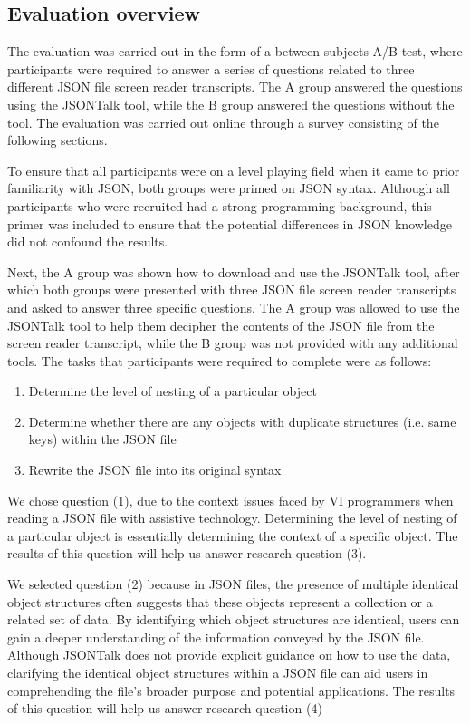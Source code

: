\documentclass{l4proj}
\begin{document}
\subsection{Evaluation overview}
The evaluation was carried out in the form of a between-subjects A/B test, where participants were required to answer a series of questions related to three different JSON file screen reader transcripts. The A group answered the questions using the JSONTalk tool, while the B group answered the questions without the tool. The evaluation was carried out online through a survey consisting of the following sections.

To ensure that all participants were on a level playing field when it came to prior familiarity with JSON, both groups were primed on JSON syntax. Although all participants who were recruited had a strong programming background, this primer was included to ensure that the potential differences in JSON knowledge did not confound the results.

Next, the A group was shown how to download and use the JSONTalk tool, after which both groups were presented with three JSON file screen reader transcripts and asked to answer three specific questions. The A group was allowed to use the JSONTalk tool to help them decipher the contents of the JSON file from the screen reader transcript, while the B group was not provided with any additional tools. The tasks that participants were required to complete were as follows:

\begin{enumerate}
    \item Determine the level of nesting of a particular object
    \item Determine whether there are any objects with duplicate structures (i.e. same keys) within the JSON file
    \item Rewrite the JSON file into its original syntax
\end{enumerate}

We chose question (1), due to the context issues faced by VI programmers when reading a JSON file with assistive technology. Determining the level of nesting of a particular object is essentially determining the context of a specific object. The results of this question will help us answer research question (3).

We selected question (2) because in JSON files, the presence of multiple identical object structures often suggests that these objects represent a collection or a related set of data. By identifying which object structures are identical, users can gain a deeper understanding of the information conveyed by the JSON file. Although JSONTalk does not provide explicit guidance on how to use the data, clarifying the identical object structures within a JSON file can aid users in comprehending the file's broader purpose and potential applications. The results of this question will help us answer research question (4)
\end{document}
